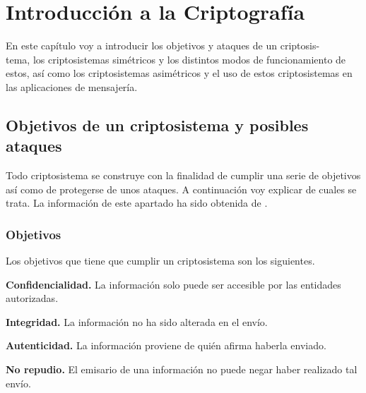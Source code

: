 \chapter{Introducción a la Criptografía}
\label{chap:dos}

En este capítulo voy a introducir los objetivos y ataques de un criptosis-\\tema, los criptosistemas simétricos y los distintos modos de funcionamiento de estos, así como los criptosistemas asimétricos y el uso de estos  criptosistemas en las aplicaciones de mensajería.

\section{Objetivos de un criptosistema y posibles ataques}
Todo criptosistema se construye con la finalidad de cumplir una serie de objetivos así como de protegerse de unos ataques. A continuación voy explicar de cuales se trata.
La información de este apartado ha sido obtenida de \cite{apuntesCriptografia}.\\ 
\subsection{Objetivos}
Los objetivos que tiene que cumplir un criptosistema son los siguientes.
\begin{description}
	\item \textbf{Confidencialidad.} 
		 La información solo puede ser accesible por las entidades autorizadas. 
	\item \textbf{Integridad.} 
		La información no ha sido alterada en el envío.
	\item \textbf{Autenticidad.} 
		La información proviene de quién afirma haberla enviado.
	\item \textbf{No repudio.}  
		El emisario de una información no puede negar haber realizado tal envío.
\end{description}
